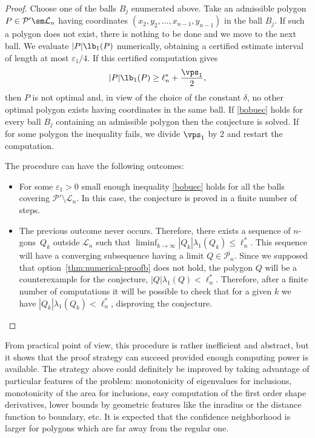 \begin{proof}
Choose one of the balls $B_j$ enumerated above. Take an admissible polygon $P\in \mathcal P'\sm \mathcal L_n$ having coordinates $(x_2,y_2,\dots,x_{n-1},y_{n-1})$ in the ball $B_j$. If such a polygon does not exist, there is nothing to be done and we move to the next ball. We evaluate $|P|\lb_1(P)$ numerically, obtaining a certified estimate interval of length at most $\varepsilon_1/4$. If this certified computation gives
\begin{equation}\label{bobuec}
|P|\lb_1(P)\ge \ell_n^*+ \frac{\vps_1}{2},
\end{equation}
then $P$ is not optimal and, in view of the choice of the constant $\delta$, no other optimal polygon exists having coordinates in the same ball. If \eqref{bobuec} holds for every ball $B_j$ containing an admissible polygon then the conjecture is solved.
If for some polygon the inequality fails, we divide $\vps_1$ by $2$ and restart the computation.

The procedure can have the following outcomes:

\begin{itemize}
\item For some $\varepsilon_1>0$ small enough inequality \eqref{bobuec} holds for all the balls covering $\mathcal P'\setminus \mathcal L_n$. In this case, the conjecture is proved in a finite number of steps.
\item The previous outcome never occurs. Therefore, there exists a sequence of $n$\nobreakdash-gons~$Q_k$ outside $\mathcal L_n$ such that $\liminf_{k \to \infty}|Q_k|\lambda_1(Q_k) \leq \ell_n^*$. This sequence will have a converging subsequence having a limit $Q \in \overline{\mathcal P_n}$. Since we supposed that option~\eqref{thm:numerical-proofb} does not hold, the polygon $Q$ will be a counterexample for the conjecture, \ie $|Q|\lambda_1(Q)<\ell_n^*$. Therefore, after a finite number of computations it will be possible to check that for a given $k$ we have $|Q_k|\lambda_1(Q_k)<\ell_n^*$, disproving the conjecture.\qedhere
\end{itemize}
\end{proof}

\begin{rem}
From practical point of view, this procedure is rather inefficient and abstract, but it shows that the proof strategy can succeed provided enough computing power is available.
The strategy above could definitely be improved by taking advantage of particular features of the problem: monotonicity of eigenvalues for inclusions, monotonicity of the area for inclusions, easy computation of the first order shape derivatives, lower bounds by geometric features like the inradius or the distance function to boundary, etc. It is expected that the confidence neighborhood is larger for polygons which are far away from the regular one.
\end{rem}

